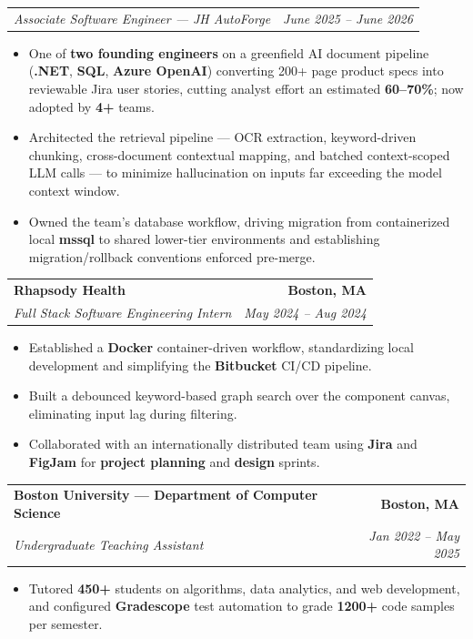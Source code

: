 \documentclass[letterpaper,11pt]{article}
\makeatletter
\newcommand{\resumeItem}[1]{
\item\small{
    {#1 \vspace{-3pt}}
  }
}
\newcommand{\resumeSubheading}[4]{%
  \vspace{-3pt}
\item%
  \begin{tabular*}{1.0\textwidth}[t]{l@{\extracolsep{\fill}}r}
    \textbf{#1} & \textbf{\small #2} \\
    \textit{\small#3} & \textit{\small #4} \\
  \end{tabular*}\vspace{-7pt}
}
\newcommand{\resumeSubheadingContinue}[2]{
  \vspace{-3pt}
  \begin{tabular*}{1.0\textwidth}[t]{l@{\extracolsep{\fill}}r}
    \textit{\small#1} & \textit{\small #2} \\
  \end{tabular*}\vspace{-7pt}
}
\newcommand{\resumeItemListStart}{%
  \begin{itemize}%
    }
\newcommand{\resumeItemListEnd}{%
  \end{itemize}\vspace{0pt}%
}
\makeatother
\begin{document}
\resumeSubheadingContinue
{Associate Software Engineer --- JH AutoForge}{June 2025 -- June 2026}
\resumeItemListStart
\resumeItem{One of \textbf{two founding engineers} on a greenfield AI document pipeline (\textbf{.NET}, \textbf{SQL}, \textbf{Azure OpenAI}) converting 200+ page product specs into reviewable Jira user stories, cutting analyst effort an estimated \textbf{60--70\%}; now adopted by \textbf{4+} teams.}

\resumeItem{Architected the retrieval pipeline --- OCR extraction, keyword-driven chunking, cross-document contextual mapping, and batched context-scoped LLM calls --- to minimize hallucination on inputs far exceeding the model context window.}

\resumeItem{Owned the team's database workflow, driving migration from containerized local \textbf{mssql} to shared lower-tier environments and establishing migration/rollback conventions enforced pre-merge.}
\resumeItemListEnd

\resumeSubheading
{Rhapsody Health}{Boston, MA}
{Full Stack Software Engineering Intern}{May 2024 -- Aug 2024}
\resumeItemListStart


\resumeItem{Established a \textbf{Docker} container-driven workflow, standardizing local development and simplifying the \textbf{Bitbucket} CI/CD pipeline.}

\resumeItem{Built a debounced keyword-based graph search over the component canvas, eliminating input lag during filtering.}

\resumeItem{Collaborated with an internationally distributed team using \textbf{Jira} and \textbf{FigJam} for \textbf{project planning} and \textbf{design} sprints.}

\resumeItemListEnd

\resumeSubheading
{Boston University --- Department of Computer Science}{Boston, MA}
{Undergraduate Teaching Assistant}{Jan 2022 -- May 2025}
\resumeItemListStart
\resumeItem{Tutored \textbf{450+} students on algorithms, data analytics, and web development, and configured \textbf{Gradescope} test automation to grade \textbf{1200+} code samples per semester.}
\resumeItemListEnd
\end{document}
